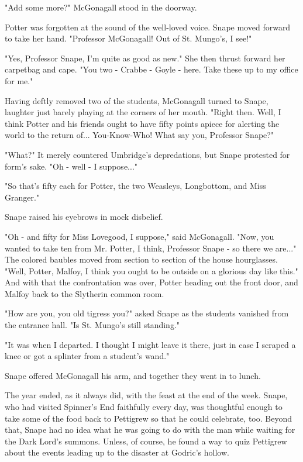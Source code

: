 \documentclass[a4paper,11pt]{article}
\begin{document}
"Add some more?" McGonagall stood in the doorway.

Potter was forgotten at the sound of the well-loved voice. Snape moved forward to take her hand. "Professor McGonagall! Out of St. Mungo's, I see!"

"Yes, Professor Snape, I'm quite as good as new." She then thrust forward her carpetbag and cape. "You two - Crabbe - Goyle - here. Take these up to my office for me."

Having deftly removed two of the students, McGonagall turned to Snape, laughter just barely playing at the corners of her mouth. "Right then. Well, I think Potter and his friends ought to have fifty points apiece for alerting the world to the return of... You-Know-Who! What say you, Professor Snape?"

"What?" It merely countered Umbridge's depredations, but Snape protested for form's sake. "Oh - well - I suppose..."

"So that's fifty each for Potter, the two Weasleys, Longbottom, and Miss Granger."

Snape raised his eyebrows in mock disbelief.

"Oh - and fifty for Miss Lovegood, I suppose," said McGonagall. "Now, you wanted to take ten from Mr. Potter, I think, Professor Snape - so there we are..." The colored baubles moved from section to section of the house hourglasses. "Well, Potter, Malfoy, I think you ought to be outside on a glorious day like this." And with that the confrontation was over, Potter heading out the front door, and Malfoy back to the Slytherin common room.

"How are you, you old tigress you?" asked Snape as the students vanished from the entrance hall. "Is St. Mungo's still standing."

"It was when I departed. I thought I might leave it there, just in case I scraped a knee or got a splinter from a student's wand."

Snape offered McGonagall his arm, and together they went in to lunch.

The year ended, as it always did, with the feast at the end of the week. Snape, who had visited Spinner's End faithfully every day, was thoughtful enough to take some of the food back to Pettigrew so that he could celebrate, too. Beyond that, Snape had no idea what he was going to do with the man while waiting for the Dark Lord's summons. Unless, of course, he found a way to quiz Pettigrew about the events leading up to the disaster at Godric's hollow.
\end{document}

